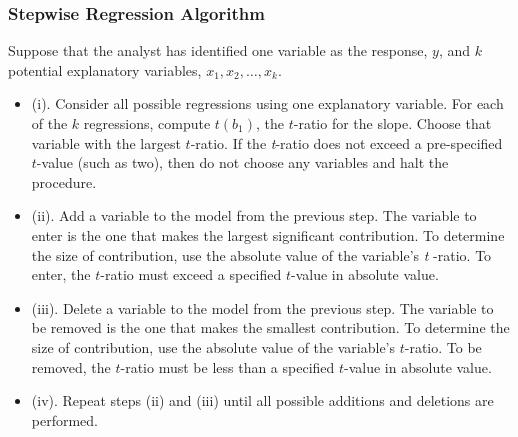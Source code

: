\begin{frame}%
 \frametitle{Stepwise Regression Algorithm}
Suppose that the analyst has identified one variable as the
response, $y$, and $k$ potential explanatory variables, $x_1, x_2,
\ldots, x_k$.
 \begin{itemize}

\item (i). Consider all possible regressions using one explanatory variable.
For each of the $k$ regressions, compute $t(b_1)$, the $t$-ratio for
the slope. Choose that variable with the largest $t$-ratio. If the
\textit{t}-ratio does not exceed a pre-specified $t$-value (such as
two), then do not choose any variables and halt the procedure.

\item (ii). Add a variable to the model from the previous step. The variable to enter
is the one that makes the largest significant contribution. To
determine the
size of contribution, use the absolute value of the variable's \textit{t}%
-ratio. To enter, the $t$-ratio must exceed a specified $t$-value in
absolute value.

\item (iii). Delete a variable to the model from the previous step. The variable to be
removed is the one that makes the smallest contribution. To
determine the size of contribution, use the absolute value of the
variable's $t$-ratio. To be removed, the $t$-ratio must be less than
a specified $t$-value in absolute value.

\item (iv). Repeat steps (ii) and (iii) until all possible additions and deletions are
performed.

 \end{itemize}
\end{frame}


